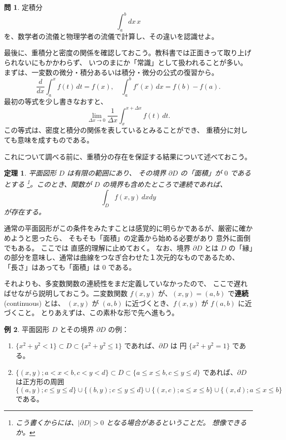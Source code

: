 \documentclass[a4paper]{jsarticle}
\newtheorem{Theorem}{定理}[section]
\theoremstyle{definition}
\newtheorem{Example}[Theorem]{例}
\newtheorem{Exercise}{問}%
\theoremstyle{remark}
\begin{document}
\begin{Exercise}
定積分
\[
\int_a^b dx\, x
\]
を、数学者の流儀と物理学者の流儀で計算し、その違いを認識せよ。
\end{Exercise}

最後に、重積分と密度の関係を確認しておこう。教科書では正面きって取り上げられないにもかかわらず、
いつのまにか「常識」として扱われることが多い。
まずは、一変数の微分・積分あるいは積分・微分の公式の復習から。
\[
\frac{d}{dx} \int_a^x f(t)\, dt = f(x), 
\quad 
\int_a^b f'(x)\,dx = f(b) - f(a). 
\]
最初の等式を少し書きなおすと、
\[
\lim_{\Delta x \to 0} \frac{1}{\Delta x} \int_x^{x+\Delta x} f(t)\, dt. 
\]
この等式は、密度と積分の関係を表しているとみることができ、
重積分に対しても意味を成すものである。

これについて調べる前に、重積分の存在を保証する結果について述べておこう。

\begin{Theorem}
平面図形 $D$ は有限の範囲にあり、
その境界 $\partial D$ の「面積」が $0$ であるとする
\footnote{こう書くからには、$|\partial D|>0$ となる場合があるということだ。
想像できるか。}。このとき、関数が $D$ の境界も含めたところで連続であれば、
\[
\int_D f(x,y)\, dxdy 
\]
が存在する。
\end{Theorem}

通常の平面図形がこの条件をみたすことは感覚的に明らかであるが、厳密に確かめようと思ったら、
そもそも「面積」の定義から始める必要があり 意外に面倒でもある。
ここでは 直感的理解に止めておく。
なお、境界 $\partial D$ とは $D$ の「縁」の部分を意味し、通常は曲線をつなぎ合わせた１次元的なものであるため、
「長さ」はあっても「面積」は $0$ である。

それよりも、多変数関数の連続性をまだ定義していなかったので、
ここで遅ればせながら説明しておこう。二変数関数 $f(x,y)$ が、$(x,y) = (a,b)$ で\textbf{連続} (continuous) とは、
$(x,y)$ が $(a,b)$ に近づくとき、$f(x,y)$ が $f(a,b)$ に近づくこと。
とりあえずは、この素朴な形で先へ進もう。

\begin{Example}
  平面図形 $D$ とその境界 $\partial D$ の例：
  \begin{enumerate}
  \item
    $\{ x^2+y^2 < 1\} \subset D \subset \{ x^2 + y^2 \leq 1\}$ であれば、$\partial D$ は 円 $\{ x^2 + y^2 = 1\}$ である。
  \item
    $\{ (x,y); a < x < b, c < y < d\} \subset D \subset \{ a \leq x \leq b, c \leq y \leq d\}$ であれば、$\partial D$ は正方形の周囲
    \[
      \{ (a,y); c \leq y \leq d\}\cup
      \{ (b,y); c \leq y \leq d\}\cup
      \{ (x,c); a \leq x \leq b\}\cup
      \{ (x,d); a \leq x \leq b\}
    \]
    である。
  \end{enumerate}
\end{Example}
\end{document}
